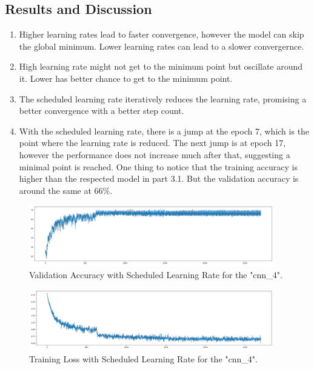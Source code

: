 \documentclass[3p,times,procedia]{elsarticle}
\begin{document}
\subsection{\textbf{Results and Discussion}}
\begin{enumerate}
    \item Higher learning rates lead to faster convergence, however the model can skip the global minimum. Lower learning rates can lead to a slower convergernce.
    \item High learning rate might not get to the minimum point but oscillate around it. Lower has better chance to get to the minimum point.
    \item The scheduled learning rate iteratively reduces the learning rate, promising a better convergence with a better step count.
    \item With the scheduled learning rate, there is a jump at the epoch 7, which is the point where the learning rate is reduced.
    The next jump is at epoch 17, however the performance does not increase much after that, suggesting a minimal point is reached.
    One thing to notice that the training accuracy is higher than the respected model in part 3.1.
    But the validation accuracy is around the same at 66\%.

\end{enumerate}

\begin{figure}[H]
    \centering
    \includegraphics[width=0.95\textwidth, trim={0 1cm 0 1cm}]{figures/cnn_4_SC_validation_acc.png}
    \caption{Validation Accuracy with Scheduled Learning Rate for the "cnn\_4".} 
    \label{fig:SC}
\end{figure}

\begin{figure}[H]
    \centering
    \includegraphics[width=0.95\textwidth, trim={0 1cm 0 1cm}]{figures/cnn_4_SC_training_loss.png}
    \caption{Training Loss with Scheduled Learning Rate for the "cnn\_4".} 
    \label{fig:SC2}
\end{figure}
\end{document}
